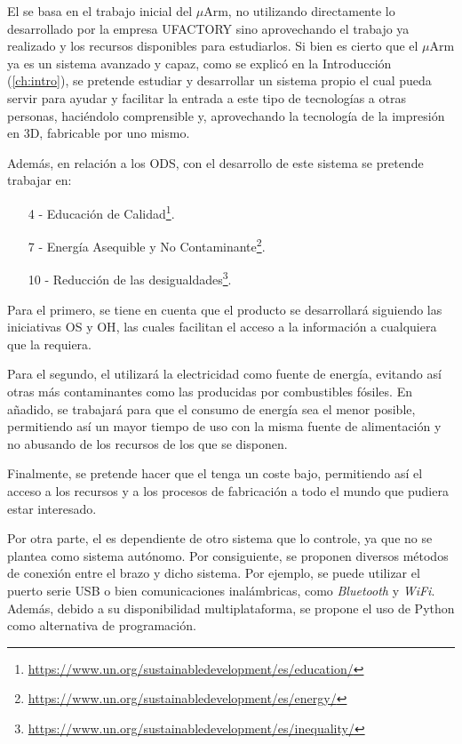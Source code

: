 El \pArm{} se basa en el trabajo inicial del $\mu$Arm, no utilizando directamente lo desarrollado por la empresa UFACTORY sino aprovechando el trabajo ya realizado y los recursos disponibles para estudiarlos. Si bien es cierto que el $\mu$Arm ya es un sistema avanzado y capaz, como se explicó en la Introducción (\ref{ch:intro}), se pretende estudiar y desarrollar un sistema propio el cual pueda servir para ayudar y facilitar la entrada a este tipo de tecnologías a otras personas, haciéndolo comprensible y, aprovechando la tecnología de la impresión en 3D, fabricable por uno mismo.

Además, en relación a los \ac{ODS}, con el desarrollo de este sistema se pretende trabajar en:

\begin{itemize}
    \item [4 -] Educación de Calidad\footnote{\url{https://www.un.org/sustainabledevelopment/es/education/}}.
    \item [7 -] Energía Asequible y No Contaminante\footnote{\url{https://www.un.org/sustainabledevelopment/es/energy/}}.
    \item [10 -] Reducción de las desigualdades\footnote{\url{https://www.un.org/sustainabledevelopment/es/inequality/}}.
\end{itemize}

Para el primero, se tiene en cuenta que el producto se desarrollará siguiendo las iniciativas \ac{OS} y \ac{OH}, las cuales facilitan el acceso a la información a cualquiera que la requiera. %

Para el segundo, el \pArm{} utilizará la electricidad como fuente de energía, evitando así otras más contaminantes como las producidas por combustibles fósiles. En añadido, se trabajará para que el consumo de energía sea el menor posible, permitiendo así un mayor tiempo de uso con la misma fuente de alimentación y no abusando de los recursos de los que se disponen.

Finalmente, se pretende hacer que el \pArm{} tenga un coste bajo, permitiendo así el acceso a los recursos y a los procesos de fabricación a todo el mundo que pudiera estar interesado. %

Por otra parte, el \pArm{} es dependiente de otro sistema que lo controle, ya que no se plantea como sistema autónomo. Por consiguiente, se proponen diversos métodos de conexión entre el brazo y dicho sistema. Por ejemplo, se puede utilizar el puerto serie \ac{USB} o bien comunicaciones inalámbricas, como \textit{Bluetooth} y \textit{WiFi}. Además, debido a su disponibilidad multiplataforma, se propone el uso de Python como alternativa de programación.

